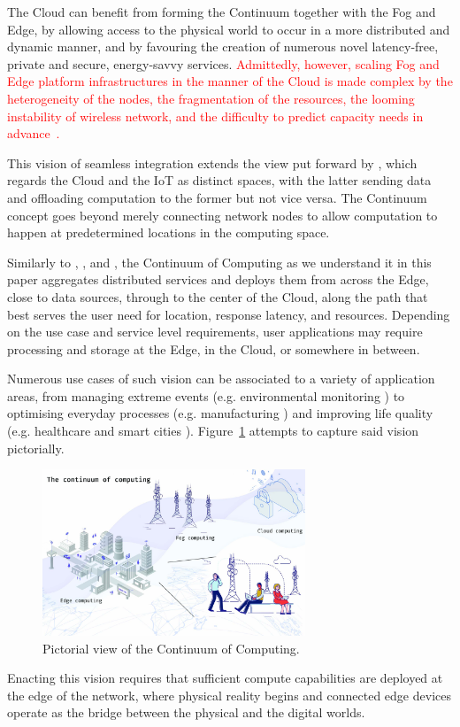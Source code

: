 The Cloud can benefit from forming the Continuum together with the Fog and Edge, by allowing access to the physical world to occur in a more distributed and dynamic manner, and by favouring the creation of numerous novel latency-free, private and secure, energy-savvy services. 
\textcolor{red}{Admittedly, however, scaling Fog and Edge platform infrastructures in the manner of the Cloud is made complex by the heterogeneity of the nodes, the fragmentation of the resources, the looming instability of wireless network, and the difficulty to predict capacity needs in advance~\cite{nygren2010akamai}. }

This vision of seamless integration extends the view put forward by \cite{botta2016integration}, which regards the Cloud and the IoT as distinct spaces, with the latter sending data and offloading computation to the former but not vice versa. The Continuum concept goes beyond merely connecting network nodes to allow computation to happen at predetermined locations in the computing space.

Similarly to \cite{latre2014fluid}, \cite{abdelbaky2017computing}, and \cite{beckman2020harnessing}, the Continuum of Computing as we understand it in this paper aggregates distributed services and deploys them from across the Edge, close to data sources, through to the center of the Cloud, along the path that best serves the user need for location, response latency, and resources.
Depending on the use case and service level requirements, user applications may require processing and storage at the Edge, in the Cloud, or somewhere in between.

Numerous use cases of such vision can be associated to a variety of application areas, from managing extreme events (e.g. environmental monitoring \cite{brzoza2016embedded}) to optimising everyday processes (e.g. manufacturing \cite{chen2018edge}) and improving life quality (e.g. healthcare \cite{pace2018edge} and smart cities \cite{he2017multitier}).
Figure~\ref{fig:continuum} attempts to capture said vision pictorially. 
\begin{figure}[ht]
\centering
\includegraphics[width=0.7\textwidth]{figures/continuum}
\caption{Pictorial view of the Continuum of Computing.}
\label{fig:continuum}
\end{figure}
Enacting this vision requires that sufficient compute capabilities are deployed at the edge of the network, where physical reality begins and connected edge devices operate as the bridge between the physical and the digital worlds.

